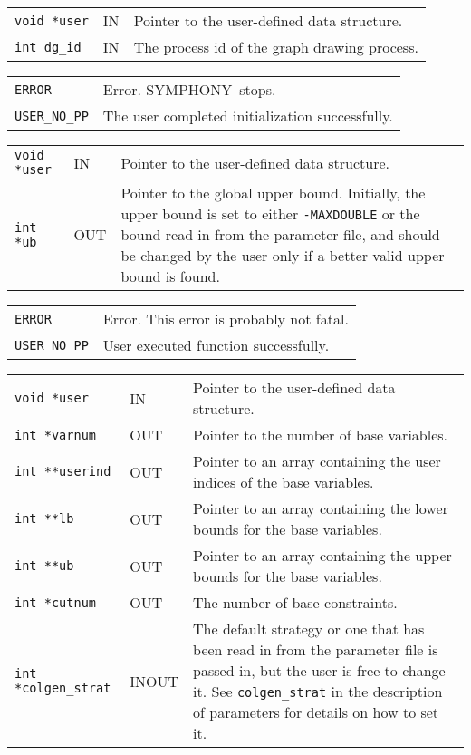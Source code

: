 \documentclass[twoside,11pt]{article}
\begin{document}
{\newpage
\clearpage
\samepage \begin{tabular}{llp{280pt}}
{\tt void *user} & IN & Pointer to the user-defined data structure. \\ 
{\tt int dg\_id} & IN & The process id of the graph drawing process. \\ 
\end{tabular}
}

{\newpage
\clearpage
\samepage \begin{tabular}{lp{300pt}}
{\tt ERROR} & Error. {\sc SYMPHONY}\ stops. \\ 
{\tt USER\_NO\_PP} & The user completed initialization successfully. \\ 
\end{tabular}
}

{\newpage
\clearpage
\samepage \begin{tabular}{llp{300pt}}
{\tt void *user} & IN & Pointer to the user-defined data structure. \\ 
{\tt int *ub} & OUT & Pointer to the global upper bound. Initially,
the upper bound is set to either {\tt -MAXDOUBLE} or the bound read in
from the parameter file, and should be changed by the user only if
a better valid upper bound is found.\\ 
\end{tabular}
}

{\newpage
\clearpage
\samepage \begin{tabular}{lp{300pt}}
{\tt ERROR} & Error. This error is probably not fatal. \\ 
{\tt USER\_NO\_PP} & User executed function successfully. \\ 
\end{tabular}
}

{\newpage
\clearpage
\samepage \begin{tabular}{llp{245pt}}
{\tt void *user} & IN & Pointer to the user-defined data structure. \\ 
{\tt int *varnum} & OUT & Pointer to the number of base variables. \\ 
{\tt int **userind} & OUT & Pointer to an array containing the user
indices of the base variables. \\ 
{\tt int **lb} & OUT & Pointer to an array containing the lower bounds for
the base variables. \\ 
{\tt int **ub} & OUT & Pointer to an array containing the upper bounds for
the base variables. \\ 
{\tt int *cutnum} & OUT & The number of base constraints. \\ 
{\tt int *colgen\_strat} & INOUT & The default strategy or one that has
been read in from the parameter file is passed in, but the user is free
to change it. See {\tt colgen\_strat} in the description of
parameters for details on how to set it.
\end{tabular}
}
\end{document}
